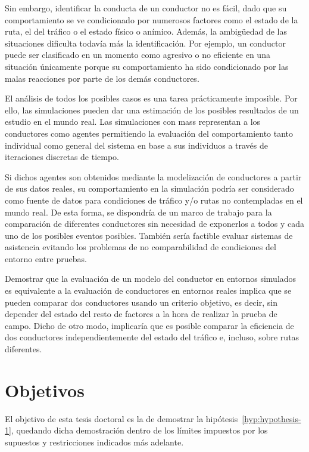 Sin embargo, identificar la conducta de un conductor no es fácil, dado que su comportamiento se ve condicionado por numerosos factores como el estado de la ruta, el del tráfico o el estado físico o anímico. Además, la ambigüedad de las situaciones dificulta todavía más la identificación. Por ejemplo, un conductor puede ser clasificado en un momento como agresivo o no eficiente en una situación únicamente porque su comportamiento ha sido condicionado por las malas reacciones por parte de los demás conductores.

El análisis de todos los posibles casos es una tarea prácticamente imposible. Por ello, las simulaciones pueden dar una estimación de los posibles resultados de un estudio en el mundo real. Las simulaciones con \acp{mas} representan a los conductores como agentes permitiendo la evaluación del comportamiento tanto individual como general del sistema en base a sus individuos a través de iteraciones discretas de tiempo.

Si dichos agentes son obtenidos mediante la modelización de conductores a partir de sus datos reales, su comportamiento en la simulación podría ser considerado como fuente de datos para condiciones de tráfico y/o rutas no contempladas en el mundo real. De esta forma, se dispondría de un marco de trabajo para la comparación de diferentes conductores sin necesidad de exponerlos a todos y cada uno de los posibles eventos posibles. También sería factible evaluar sistemas de asistencia evitando los problemas de no comparabilidad de condiciones del entorno entre pruebas.

Demostrar que la evaluación de un modelo del conductor en entornos simulados es equivalente a la evaluación de conductores en entornos reales implica que se pueden comparar dos conductores usando un criterio objetivo, es decir, sin depender del estado del resto de factores a la hora de realizar la prueba de campo. Dicho de otro modo, implicaría que es posible comparar la eficiencia de dos conductores independientemente del estado del tráfico e, incluso, sobre rutas diferentes.

\section{Objetivos}
\label{ch:intro:objectives}

El objetivo de esta tesis doctoral es la de demostrar la hipótesis~\ref{hyp:hypothesis-1}, quedando dicha demostración dentro de los límites impuestos por los supuestos y restricciones indicados más adelante.

